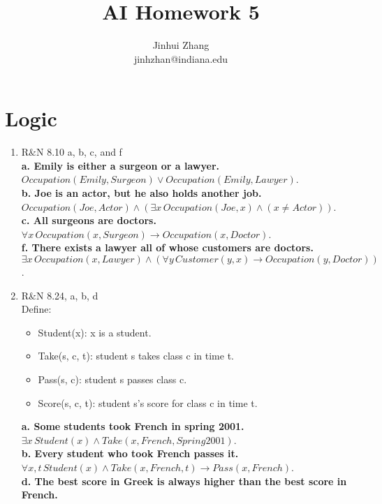 \documentclass[12pt]{article}
\begin{document}
\title{AI Homework 5}%
\author{Jinhui Zhang\\
jinhzhan@indiana.edu}  
\maketitle

\section{Logic}
\begin{enumerate}
\item R$\&$N 8.10  a, b, c, and f\\
\textbf{a. Emily is either a surgeon or a lawyer. }\\
$Occupation(Emily, Surgeon)\vee Occupation(Emily, Lawyer)$. \\
\textbf{b. Joe is an actor, but he also holds another job. }\\
$Occupation(Joe, Actor)\wedge(\exists x\, Occupation(Joe, x)\wedge (x\neq Actor))$. \\
\textbf{c. All surgeons are doctors. }\\
$\forall x\, Occupation(x, Surgeon)\rightarrow Occupation(x, Doctor)$. \\
\textbf{f. There exists a lawyer all of whose customers are doctors. }\\
$\exists x\, Occupation(x, Lawyer)\wedge(\forall y\, Customer(y, x)\rightarrow Occupation(y, Doctor))$. 
\item R$\&$N 8.24, a, b, d\\
Define: \begin{itemize}
\item Student(x): x is a student. 
\item Take(s, c, t): student s takes class c in time t. 
\item Pass(s, c): student s passes class c. 
\item Score(s, c, t): student s's score for class c in time t. 
\end{itemize}
\textbf{a. Some students took French in spring 2001. }\\
$\exists x\, Student(x)\wedge Take(x, French, Spring 2001)$. \\
\textbf{b. Every student who took French passes it. }\\
$\forall x, t\, Student(x)\wedge Take(x, French, t)\rightarrow Pass(x, French)$. \\
\textbf{d. The best score in Greek is always higher than the best score in French. }\\

\end{enumerate}
\end{document}
